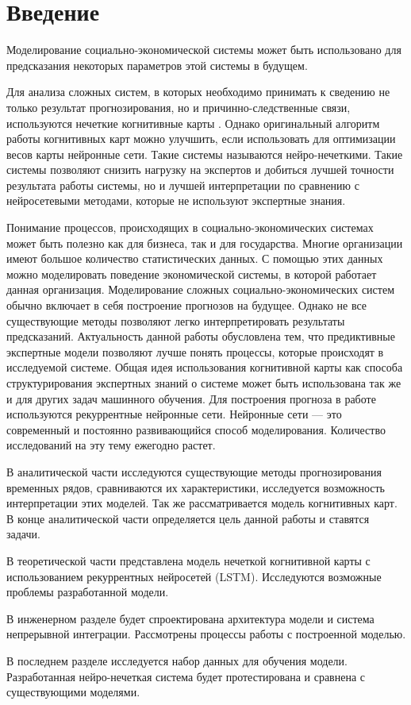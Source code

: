 \chapter*{Введение}
\label{sec:afterwords}

Моделирование социально-экономической системы может быть использовано для предсказания
некоторых параметров этой системы в будущем.

Для анализа сложных систем, в которых необходимо принимать к сведению
не только результат прогнозирования, но и причинно-следственные связи,
используются нечеткие когнитивные карты \cite{osoba2019dags} \cite{kosko1986fuzzy}.
Однако оригинальный алгоритм работы когнитивных карт можно улучшить,
если использовать для оптимизации весов карты нейронные сети.
Такие системы называются нейро-нечеткими.
Такие системы позволяют снизить нагрузку на экспертов и
добиться лучшей точности результата работы системы, но и лучшей интерпретации по сравнению
с нейросетевыми методами, которые не используют экспертные знания.

Понимание процессов, происходящих в социально-экономических системах
может быть полезно как для бизнеса, так и для государства.
Многие организации имеют большое количество статистических данных.
С помощью этих данных можно моделировать поведение
экономической системы, в которой работает данная организация.
Моделирование сложных социально-экономических систем обычно
включает в себя построение прогнозов на будущее.
Однако не все существующие методы позволяют
легко интерпретировать результаты предсказаний.
Актуальность данной работы обусловлена тем, что предиктивные экспертные модели
позволяют лучше понять процессы, которые происходят в
исследуемой системе. Общая идея использования когнитивной карты
как способа структурирования экспертных знаний о системе
может быть использована так же и для других задач машинного обучения.
Для построения прогноза в работе используются рекуррентные нейронные
сети. Нейронные сети --- это современный и постоянно
развивающийся способ моделирования. Количество исследований
на эту тему ежегодно растет.

В аналитической части исследуются существующие методы прогнозирования
временных рядов, сравниваются их характеристики, исследуется
возможность интерпретации этих моделей. Так же рассматривается
модель когнитивных карт. В конце аналитической части определяется
цель данной работы и ставятся задачи.

В теоретической части представлена модель нечеткой когнитивной карты с использованием
рекуррентных нейросетей (LSTM). Исследуются возможные проблемы разработанной модели.

В инженерном разделе будет спроектирована архитектура модели и
система непрерывной интеграции. Рассмотрены процессы работы с построенной моделью.

В последнем разделе исследуется набор данных для обучения модели.
Разработанная нейро-нечеткая система будет протестирована и сравнена
с существующими моделями.